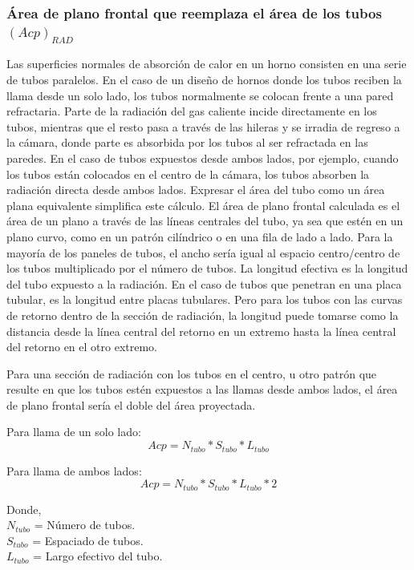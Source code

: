 \subsubsection{Área de plano frontal que reemplaza el área de los tubos $(Acp)_{RAD}$}
\par Las superficies normales de absorción de calor en un horno consisten en una serie de tubos paralelos. En el caso de un diseño de hornos donde los tubos reciben la llama desde un solo lado, los tubos normalmente se colocan frente a una pared refractaria. Parte de la radiación del gas caliente incide directamente en los tubos, mientras que el resto pasa a través de las hileras y se irradia de regreso a la cámara, donde parte es absorbida por los tubos al ser refractada en las paredes. En el caso de tubos expuestos desde ambos lados, por ejemplo, cuando los tubos están colocados en el centro de la cámara, los tubos absorben la radiación directa desde ambos lados. Expresar el área del tubo como un área plana equivalente simplifica este cálculo. El área de plano frontal calculada es el área de un plano a través de las líneas centrales del tubo, ya sea que estén en un plano curvo, como en un patrón cilíndrico o en una fila de lado a lado. Para la mayoría de los paneles de tubos, el ancho sería igual al espacio centro/centro de los tubos multiplicado por el número de tubos. La longitud efectiva es la longitud del tubo expuesto a la radiación. En el caso de tubos que penetran en una placa tubular, es la longitud entre placas tubulares. Pero para los tubos con las curvas de retorno dentro de la sección de radiación, la longitud puede tomarse como la distancia desde la línea central del retorno en un extremo hasta la línea central del retorno en el otro extremo.
\par Para una sección de radiación con los tubos en el centro, u otro patrón que resulte en que los tubos estén expuestos a las llamas desde ambos lados, el área de plano frontal sería el doble del área proyectada.
\par Para llama de un solo lado:
\begin{equation}
Acp = N_{tubo} * S_{tubo} * L_{tubo}
\end{equation}
\par Para llama de ambos lados:
\begin{equation}
Acp = N_{tubo} * S_{tubo} * L_{tubo} * 2
\end{equation}
\par Donde, \\
$N_{tubo}$ = Número de tubos. \\
$S_{tubo}$ = Espaciado de tubos. \\
$L_{tubo}$ = Largo efectivo del tubo.

